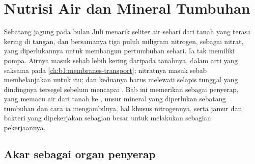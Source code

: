 \chapter{Nutrisi Air dan Mineral Tumbuhan}\label{ch:b1:plant-water-minerals}

Sebatang jagung pada bulan Juli menarik seliter air sehari dari tanah
yang terasa kering di tangan, dan bersamanya tiga puluh miligram
nitrogen, sebagai nitrat, yang diperlukannya untuk membangun
pertumbuhan sehari. Ia tak memiliki pompa. Airnya masuk sebab 
lebih kering daripada tanahnya, dalam arti yang saksama pada
\cref{ch:b1:membranes-transport}; nitratnya masuk sebab  
membelanjakan  untuk itu; dan keduanya harus melewati selapis
tunggal  yang dindingnya tersegel  sebelum mencapai .
Bab ini memerikan  sebagai  penyerap,  yang
memacu air dari tanah ke , unsur mineral yang diperlukan sebatang
tumbuhan dan cara ia mengambilnya, hal khusus nitrogennya, serta jamur
dan bakteri yang dipekerjakan sebagian besar  untuk melakukan
sebagian pekerjaannya.

\section{Akar sebagai organ penyerap}

